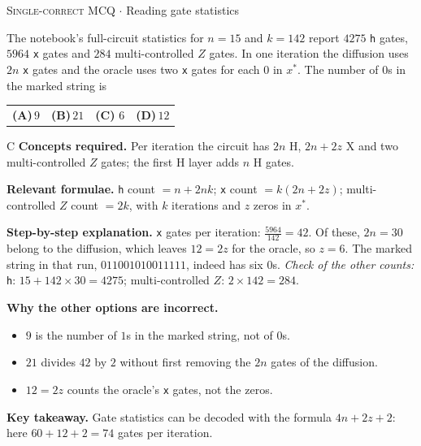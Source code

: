 \documentclass[11pt,a4paper]{article}
\newcommand{\optlabel}[1]{\textbf{(#1)}}
\newcommand{\correctlabel}[1]{\textcolor{okgreen}{\textbf{(#1)}\,\ding{51}}}
\newenvironment{qitem}[1]{\begin{list}{}{\setlength{\leftmargin}{3.3em}\setlength{\labelwidth}{3.1em}%
  \setlength{\labelsep}{0.2em}\setlength{\topsep}{3pt}\setlength{\parsep}{3pt}}\item[\textbf{Q.#1}\hfill]}{\end{list}}
\newcommand{\qsep}{\par\vspace{2pt}{\color{black!15}\hrule}\vspace{4pt}}
\newcommand{\qmeta}[2]{{\footnotesize\color{black!60}\textsc{#1} \;$\cdot$\; #2}\par}
\begin{document}
\begin{qitem}{65}
\qmeta{Single-correct MCQ}{Reading gate statistics}
The notebook's full-circuit statistics for $n = 15$ and $k = 142$ report $4275$ \texttt{h} gates, $5964$ \texttt{x} gates and $284$ multi-controlled $Z$ gates. In one iteration the diffusion uses $2n$ \texttt{x} gates and the oracle uses two \texttt{x} gates for each $0$ in $x^\ast$. The number of $0$s in the marked string is
\par\smallskip\noindent\begin{tabularx}{\linewidth}{@{}*{4}{L}@{}}
\optlabel{A}\,$9$ & \optlabel{B}\,$21$ & \correctlabel{C}\,$6$ & \optlabel{D}\,$12$
\end{tabularx}
\end{qitem}
\begin{solbox}{C}
\textbf{\color{brand}Concepts required.} Per iteration the circuit has $2n$ H, $2n + 2z$ X and two multi-controlled $Z$ gates; the first H layer adds $n$ H gates.

\textbf{\color{brand}Relevant formulae.} \texttt{h} count $= n + 2nk$; \texttt{x} count $= k(2n + 2z)$; multi-controlled $Z$ count $= 2k$, with $k$ iterations and $z$ zeros in $x^\ast$.

\textbf{\color{brand}Step-by-step explanation.} \texttt{x} gates per iteration: $\frac{5964}{142} = 42$. Of these, $2n = 30$ belong to the diffusion, which leaves $12 = 2z$ for the oracle, so $z = 6$. The marked string in that run, $011001010011111$, indeed has six $0$s.
\emph{Check of the other counts:} \texttt{h}: $15 + 142\times30 = 4275$; multi-controlled $Z$: $2\times142 = 284$.

\textbf{\color{brand}Why the other options are incorrect.}
\begin{itemize}[leftmargin=2.4em, itemsep=1pt, topsep=2pt]
\item[\textbf{(A)}] $9$ is the number of $1$s in the marked string, not of $0$s.
\item[\textbf{(B)}] $21$ divides $42$ by $2$ without first removing the $2n$ gates of the diffusion.
\item[\textbf{(D)}] $12 = 2z$ counts the oracle's \texttt{x} gates, not the zeros.
\end{itemize}
\textbf{\color{brand}Key takeaway.} Gate statistics can be decoded with the formula $4n + 2z + 2$: here $60 + 12 + 2 = 74$ gates per iteration.
\end{solbox}
\qsep
\end{document}
